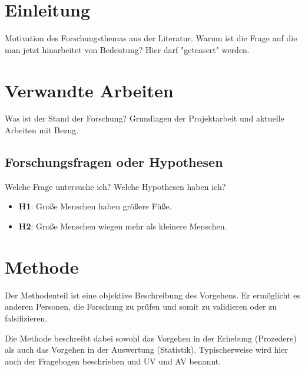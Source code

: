 
\section{Einleitung}
Motivation des Forschungsthemas aus der Literatur. Warum ist die Frage auf die man jetzt hinarbeitet von Bedeutung? Hier darf "geteasert" werden.







\section{Verwandte Arbeiten}
Was ist der Stand der Forschung? Grundlagen der Projektarbeit und aktuelle Arbeiten mit Bezug.



\subsection{Forschungsfragen oder Hypothesen}
Welche Frage untersuche ich? Welche Hypothesen haben ich?
\begin{itemize}
\item \textbf{H1}: Große Menschen haben größere Füße.
\item \textbf{H2}: Große Menschen wiegen mehr als kleinere Menschen.
\end{itemize}



\section{Methode}
Der Methodenteil ist eine objektive Beschreibung des Vorgehens. Er ermöglicht es anderen Personen, die Forschung zu prüfen und somit zu validieren oder zu falsifizieren.

Die Methode beschreibt dabei sowohl das Vorgehen in der Erhebung (Prozedere) als auch das Vorgehen in der Auswertung (Statistik). 
Typischerweise wird hier auch der Fragebogen beschrieben und UV und AV benannt.









